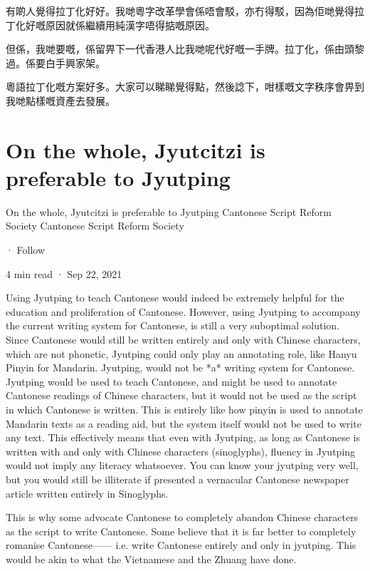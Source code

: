 有啲人覺得拉丁化好好。我哋粵字改革學會係唔會駁，亦冇得駁，因為佢哋覺得拉丁化好嘅原因就係繼續用純漢字唔得掂嘅原因。

但係，我哋要嘅，係留畀下一代香港人比我哋呢代好嘅一手牌。拉丁化，係由頭黎過。係要白手興家架。

粵語拉丁化嘅方案好多。大家可以睇睇覺得點，然後諗下，咁樣嘅文字秩序會畀到我哋點樣嘅資產去發展。



\section{On the whole, Jyutcitzi is preferable to Jyutping}

On the whole, Jyutcitzi is preferable to Jyutping
Cantonese Script Reform Society
Cantonese Script Reform Society

·
Follow

4 min read
·
Sep 22, 2021





Using Jyutping to teach Cantonese would indeed be extremely helpful for the education and proliferation of Cantonese. However, using Jyutping to accompany the current writing system for Cantonese, is still a very suboptimal solution. Since Cantonese would still be written entirely and only with Chinese characters, which are not phonetic, Jyutping could only play an annotating role, like Hanyu Pinyin for Mandarin. Jyutping, would not be *a* writing system for Cantonese. Jyutping would be used to teach Cantonese, and might be used to annotate Cantonese readings of Chinese characters, but it would not be used as the script in which Cantonese is written. This is entirely like how pinyin is used to annotate Mandarin texts as a reading aid, but the system itself would not be used to write any text. This effectively means that even with Jyutping, as long as Cantonese is written with and only with Chinese characters (sinoglyphs), fluency in Jyutping would not imply any literacy whatsoever. You can know your jyutping very well, but you would still be illiterate if presented a vernacular Cantonese newspaper article written entirely in Sinoglyphs.

This is why some advocate Cantonese to completely abandon Chinese characters as the script to write Cantonese. Some believe that it is far better to completely romanise Cantonese—— i.e. write Cantonese entirely and only in jyutping. This would be akin to what the Vietnamese and the Zhuang have done.

